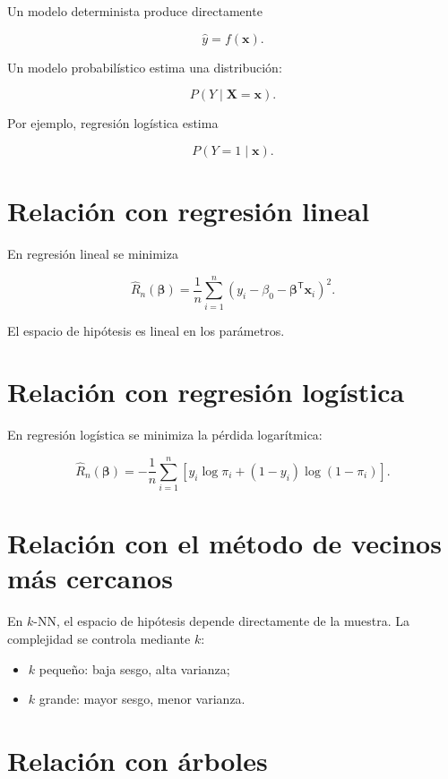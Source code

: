 \documentclass[
  spanish,
  11pt,
  letterpaper,
  DIV=11,
  numbers=noendperiod]{scrreprt}
\providecommand{\tightlist}{%
  \setlength{\itemsep}{0pt}\setlength{\parskip}{0pt}}
\theoremstyle{definition}
\theoremstyle{plain}
\theoremstyle{definition}
\theoremstyle{remark}
\begin{document}
Un modelo determinista produce directamente

\[
\widehat{y}=f(\mathbf{x}).
\]

Un modelo probabilístico estima una distribución:

\[
P(Y\mid\mathbf{X}=\mathbf{x}).
\]

Por ejemplo, regresión logística estima

\[
P(Y=1\mid\mathbf{x}).
\]

\section{Relación con regresión
lineal}\label{relaciuxf3n-con-regresiuxf3n-lineal-2}

En regresión lineal se minimiza

\[
\widehat{R}_n(\boldsymbol{\beta})
=
\frac{1}{n}
\sum_{i=1}^{n}
(
y_i
-
\beta_0
-
\boldsymbol{\beta}^{\mathsf T}\mathbf{x}_i
)^2.
\]

El espacio de hipótesis es lineal en los parámetros.

\section{Relación con regresión
logística}\label{relaciuxf3n-con-regresiuxf3n-loguxedstica-2}

En regresión logística se minimiza la pérdida logarítmica:

\[
\widehat{R}_n(\boldsymbol{\beta})
=
-
\frac{1}{n}
\sum_{i=1}^{n}
\left[
y_i\log\pi_i
+
(1-y_i)\log(1-\pi_i)
\right].
\]

\section{Relación con el método de vecinos más
cercanos}\label{relaciuxf3n-con-el-muxe9todo-de-vecinos-muxe1s-cercanos}

En \(k\)-NN, el espacio de hipótesis depende directamente de la muestra.
La complejidad se controla mediante \(k\):

\begin{itemize}
\tightlist
\item
  \(k\) pequeño: baja sesgo, alta varianza;
\item
  \(k\) grande: mayor sesgo, menor varianza.
\end{itemize}

\section{Relación con árboles}\label{relaciuxf3n-con-uxe1rboles}
\end{document}
